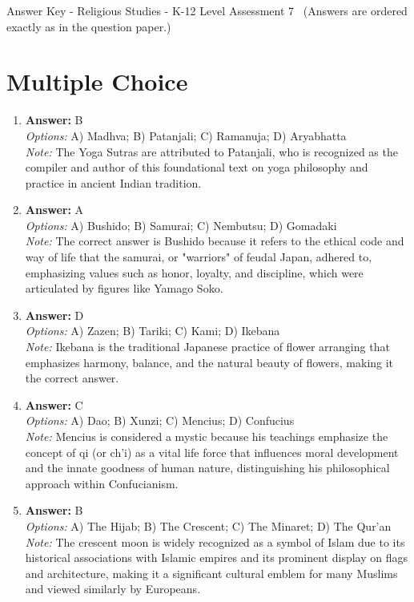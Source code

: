 \documentclass[12pt]{article}
\begin{document}
\begin{center}
Answer Key - Religious Studies - K-12 Level Assessment 7 \
\small (Answers are ordered exactly as in the question paper.)
\end{center}

\section*{Multiple Choice}
\begin{enumerate}[label=\arabic*.]
\item \textbf{Answer:} B
\\ \textit{Options:} A) Madhva; B) Patanjali; C) Ramanuja; D) Aryabhatta
\\ \textit{Note:} The Yoga Sutras are attributed to Patanjali, who is recognized as the compiler and author of this foundational text on yoga philosophy and practice in ancient Indian tradition.
\item \textbf{Answer:} A
\\ \textit{Options:} A) Bushido; B) Samurai; C) Nembutsu; D) Gomadaki
\\ \textit{Note:} The correct answer is Bushido because it refers to the ethical code and way of life that the samurai, or "warriors" of feudal Japan, adhered to, emphasizing values such as honor, loyalty, and discipline, which were articulated by figures like Yamago Soko.
\item \textbf{Answer:} D
\\ \textit{Options:} A) Zazen; B) Tariki; C) Kami; D) Ikebana
\\ \textit{Note:} Ikebana is the traditional Japanese practice of flower arranging that emphasizes harmony, balance, and the natural beauty of flowers, making it the correct answer.
\item \textbf{Answer:} C
\\ \textit{Options:} A) Dao; B) Xunzi; C) Mencius; D) Confucius
\\ \textit{Note:} Mencius is considered a mystic because his teachings emphasize the concept of qi (or ch'i) as a vital life force that influences moral development and the innate goodness of human nature, distinguishing his philosophical approach within Confucianism.
\item \textbf{Answer:} B
\\ \textit{Options:} A) The Hijab; B) The Crescent; C) The Minaret; D) The Qur'an
\\ \textit{Note:} The crescent moon is widely recognized as a symbol of Islam due to its historical associations with Islamic empires and its prominent display on flags and architecture, making it a significant cultural emblem for many Muslims and viewed similarly by Europeans.
\end{enumerate}
\end{document}
